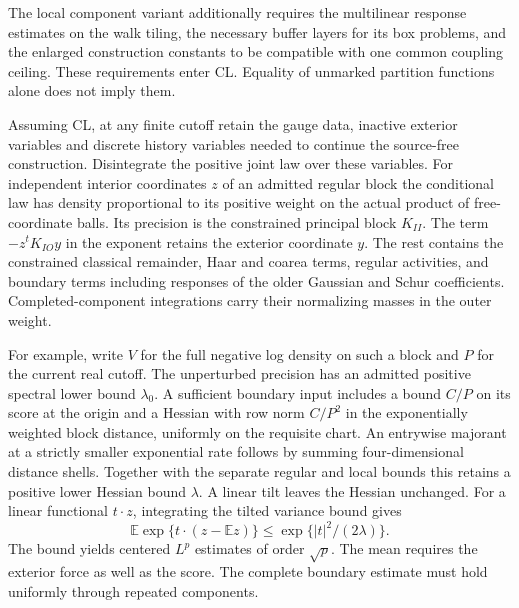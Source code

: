 \documentclass[11pt,letterpaper]{article}
\begin{document}
The local component variant additionally requires the multilinear
response estimates on the walk tiling, the necessary buffer layers for
its box problems, and the enlarged construction constants to be
compatible with one common coupling ceiling. These requirements enter
CL. Equality of unmarked partition functions alone does not imply them.


Assuming CL, at any finite cutoff retain the gauge data, inactive exterior variables and
discrete history variables needed to continue the source-free construction.
Disintegrate the positive joint law over these variables. For independent
interior coordinates \(z\) of an admitted regular block the conditional
law has density proportional to its positive weight on the actual product
of free-coordinate balls. Its precision is the constrained principal block
\(K_{II}\). The term \(-z^tK_{IO}y\) in the exponent retains the exterior
coordinate \(y\). The rest contains the constrained classical remainder,
Haar and coarea terms, regular activities, and boundary terms including
responses of the older Gaussian and Schur coefficients. Completed-component
integrations carry their normalizing masses in the outer weight.

For example, write \(V\) for the full negative log density on such a
block and \(P\) for the current real cutoff. The unperturbed precision has
an admitted positive spectral lower bound \(\lambda_0\). A sufficient
boundary input includes a bound \(C/P\) on its score at the origin and
a Hessian with row norm \(C/P^2\) in the exponentially weighted block
distance, uniformly on the requisite chart. An entrywise majorant at a
strictly smaller exponential rate follows by summing four-dimensional
distance shells. Together with the separate regular and local bounds this
retains a positive lower Hessian bound \(\lambda\). A linear tilt leaves
the Hessian unchanged. For a linear functional \(t\cdot z\), integrating
the tilted variance bound gives
\[
  \mathbb E\exp\{t\cdot(z-\mathbb Ez)\}\le
          \exp\{|t|^2/(2\lambda)\}.
\]
The bound yields centered \(L^p\) estimates of order \(\sqrt p\). The mean
requires the exterior force as well as the score. The complete boundary
estimate must hold uniformly through repeated components.
\end{document}
